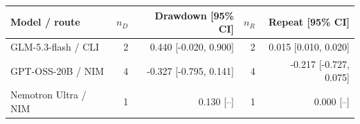 \begin{tabular}{lrrrr}
\toprule
Model / route & $n_D$ & Drawdown [95\% CI] & $n_R$ & Repeat [95\% CI] \\
\midrule
GLM-5.3-flash / CLI & 2 & 0.440 [-0.020, 0.900] & 2 & 0.015 [0.010, 0.020] \\
GPT-OSS-20B / NIM & 4 & -0.327 [-0.795, 0.141] & 4 & -0.217 [-0.727, 0.075] \\
Nemotron Ultra / NIM & 1 & 0.130 [--] & 1 & 0.000 [--] \\
\bottomrule
\end{tabular}
